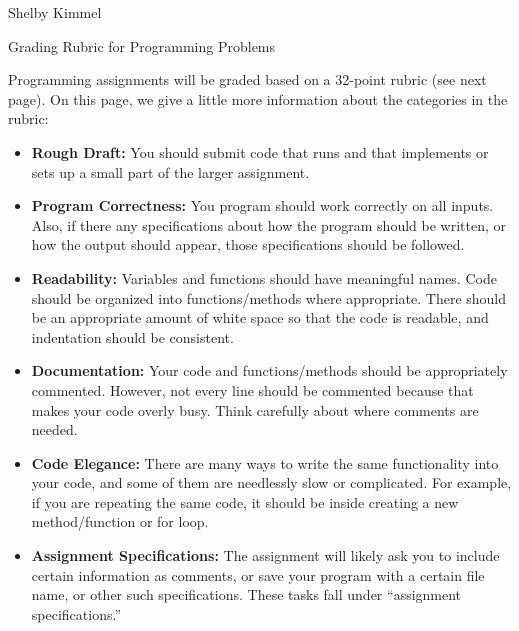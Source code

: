 \documentclass[11pt,landscape]{article}
\begin{document}
\hfill Shelby Kimmel

\begin{center}
{\huge Grading Rubric for Programming Problems}
\end{center}
\bigskip

Programming assignments will be graded based on a 32-point rubric (see next page). On this page, we give a little more information about the categories in the rubric:

\begin{itemize}
\item \textbf{Rough Draft:} You should submit code that runs and that implements or sets up a small part of the larger assignment.

\item \textbf{Program Correctness:} You program should work correctly on all inputs. Also, if there any specifications about how the program should be written, or how the output should appear, those specifications should be followed.

\item \textbf{Readability:} Variables and functions should have meaningful names. Code should be organized into functions/methods where appropriate. There should be an appropriate amount of white space so that the code is readable, and indentation should be consistent.

\item \textbf{Documentation:} Your code and functions/methods should be appropriately commented. However, not every line should be commented because that makes your code overly busy. Think carefully about where comments are needed. 

\item \textbf{Code Elegance:} There are many ways to write the same functionality into your code, and some of them are needlessly slow or complicated. For example, if you are repeating the same code, it should be inside  creating a new method/function or for loop.

\item \textbf{Assignment Specifications:} The assignment will likely ask you to include certain information as comments, or save your program with a certain file name, or other such specifications. These tasks fall under ``assignment specifications.''
\end{itemize}
\end{document}
